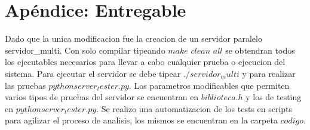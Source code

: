 \section{Ap\'endice: Entregable}
Dado que la unica modificacion fue la creacion de un servidor paralelo servidor\_multi. Con solo compilar tipeando $make$ $clean$ $all$ se obtendran todos los ejecutables necesarios para llevar a cabo cualquier prueba o ejecucion del sistema. Para ejecutar el servidor se debe tipear $./servidor_multi$ y para realizar las pruebas $python server_tester.py$. Los parametros modificables que permiten varios tipos de pruebas del servidor se encuentran en $biblioteca.h$ y los de testing en $python server_tester.py$. Se realizo una automatizacion de los tests en scripts para agilizar el proceso de analisis, los mismos se encuentran en la carpeta $codigo$.